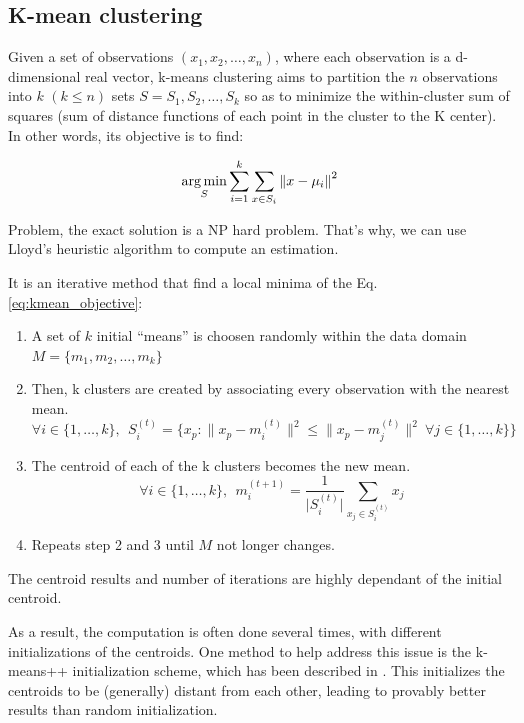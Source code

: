 \subsection{K-mean clustering}

Given a set of observations $(x_1, x_2, …, x_n)$, where each observation is a d-dimensional real vector, k-means clustering aims to partition the $n$ observations into $k$ $(k \leq n)$ sets $S = {S_1, S_2, …, S_k}$ so as to minimize the within-cluster sum of squares (sum of distance functions of each point in the cluster to the K center). In other words, its objective is to find:

\begin{equation} \label{eq:kmean_objective}
    \underset {S}{\operatorname {arg\,min}} \sum _{i=1}^{k} \sum _{x \in S_{i}} \left\| x - \mu_{i} \right\|^{2}
\end{equation}

Problem, the exact solution is a NP hard problem. That's why, we can use Lloyd's heuristic algorithm to compute an estimation.

It is an iterative method that find a local minima of the Eq. \ref{eq:kmean_objective}:

\begin{enumerate}
    \item A set of $k$ initial \enquote{means} is choosen randomly within the data domain $M = \{m_1, m_2, \ldots, m_k \}$
    
    \item Then, k clusters are created by associating every observation with the nearest mean.
    $$ \forall i \in \{ 1, \ldots, k \}, ~~ S_{i}^{(t)}= \big \{ x_{p}:{\big \|}x_{p}-m_{i}^{(t)}{\big \|}^{2}\leq {\big \|}x_{p}-m_{j}^{(t)}{\big \|}^{2} ~ \forall j \in \{ 1, \ldots, k \} \big \}$$
    
    \item The centroid of each of the k clusters becomes the new mean.
    $$ \forall i \in \{ 1, \ldots, k \}, ~~ m_{i}^{(t+1)}=\frac {1}{\lvert S_{i}^{(t)} \rvert } \sum _{x_{j} \in S_{i}^{(t)}} x_{j} $$
    
    \item Repeats step 2 and 3 until $M$ not longer changes.
\end{enumerate}

The centroid results and number of iterations are highly dependant of the initial centroid.

As a result, the computation is often done several times, with different initializations of the centroids. One method to help address this issue is the k-means++ initialization scheme, which has been described in \cite{Arthur2007}. This initializes the centroids to be (generally) distant from each other, leading to provably better results than random initialization.
